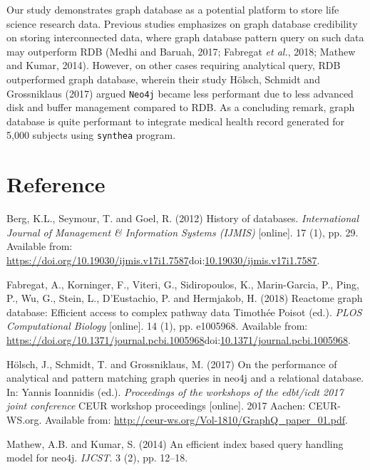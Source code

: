 \documentclass[]{article}
\begin{document}
Our study demonstrates graph database as a potential platform to store
life science research data. Previous studies emphasizes on graph
database credibility on storing interconnected data, where graph
database pattern query on such data may outperform RDB (Medhi and
Baruah, 2017; Fabregat \emph{et al.}, 2018; Mathew and Kumar, 2014).
However, on other cases requiring analytical query, RDB outperformed
graph database, wherein their study Hölsch, Schmidt and Grossniklaus
(2017) argued \texttt{Neo4j} became less performant due to less advanced
disk and buffer management compared to RDB. As a concluding remark,
graph database is quite performant to integrate medical health record
generated for 5,000 subjects using \texttt{synthea} program.

\hypertarget{reference}{%
\section*{Reference}\label{reference}}

\clearpage

\hypertarget{refs}{}
\leavevmode\hypertarget{ref-Berg2012}{}%
Berg, K.L., Seymour, T. and Goel, R. (2012) History of databases.
\emph{International Journal of Management \& Information Systems
(IJMIS)} {[}online{]}. 17 (1), pp. 29. Available from:
\url{https://doi.org/10.19030/ijmis.v17i1.7587}doi:\href{https://doi.org/10.19030/ijmis.v17i1.7587}{10.19030/ijmis.v17i1.7587}.

\leavevmode\hypertarget{ref-Fabregat2018}{}%
Fabregat, A., Korninger, F., Viteri, G., Sidiropoulos, K., Marin-Garcia,
P., Ping, P., Wu, G., Stein, L., D'Eustachio, P. and Hermjakob, H.
(2018) Reactome graph database: Efficient access to complex pathway data
Timothée Poisot (ed.). \emph{PLOS Computational Biology} {[}online{]}.
14 (1), pp. e1005968. Available from:
\url{https://doi.org/10.1371/journal.pcbi.1005968}doi:\href{https://doi.org/10.1371/journal.pcbi.1005968}{10.1371/journal.pcbi.1005968}.

\leavevmode\hypertarget{ref-Holsch2017}{}%
Hölsch, J., Schmidt, T. and Grossniklaus, M. (2017) On the performance
of analytical and pattern matching graph queries in neo4j and a
relational database. In: Yannis Ioannidis (ed.). \emph{Proceedings of
the workshops of the edbt/icdt 2017 joint conference} CEUR workshop
proceedings {[}online{]}. 2017 Aachen: CEUR-WS.org. Available from:
\url{http://ceur-ws.org/Vol-1810/GraphQ_paper_01.pdf}.

\leavevmode\hypertarget{ref-Mathew2014}{}%
Mathew, A.B. and Kumar, S. (2014) An efficient index based query
handling model for neo4j. \emph{IJCST}. 3 (2), pp. 12--18.
\end{document}
